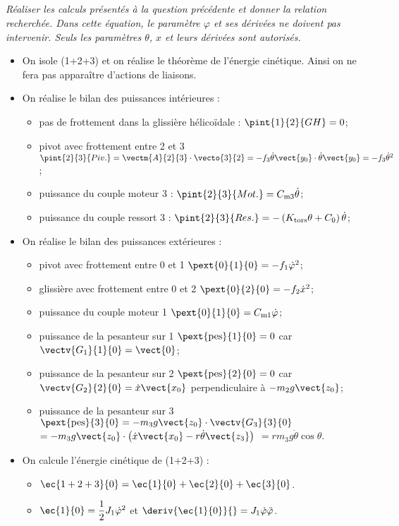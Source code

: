 \subparagraph{\label{q_06}}\textit{Réaliser les calculs présentés à la question précédente et donner la relation recherchée. Dans cette équation, le paramètre $\varphi$ et ses dérivées ne doivent pas intervenir. Seuls
les paramètres $\theta$, $x$ et leurs dérivées sont autorisés.}
\ifprof
\begin{corrige}
\begin{itemize}
\item On isole (1+2+3) et on réalise le théorème de l'énergie cinétique. Ainsi on ne fera pas apparaître d'actions de liaisons.
\item On réalise le bilan des puissances intérieures : 
\begin{itemize}
\item pas de frottement dans la glissière hélicoïdale : $\pint{1}{2}{GH} = 0$;
\item pivot avec frottement entre 2 et 3 $\pint{2}{3}{Piv.} = \vectm{A}{2}{3} \cdot  \vecto{3}{2} = -f_3 \dot{\theta} \vect{y_0} \cdot \dot{\theta}\vect{y_0} = -f_3 \dot{\theta}^2$;
\item puissance du couple moteur 3 : $\pint{2}{3}{Mot.} =  C_{\text{m3}}\dot{\theta}$; 
\item puissance du couple ressort 3 : $\pint{2}{3}{Res.} =  -\left(K_{\text{tors}}\theta + C_0\right) \dot{\theta}$; 
\end{itemize}
\item On réalise le bilan des puissances extérieures : 
\begin{itemize}
\item pivot avec frottement entre 0 et 1 $\pext{0}{1}{0} =-f_1 \dot{\varphi}^2 $;
\item glissière avec frottement entre 0 et 2 $\pext{0}{2}{0} = - f_2 \dot{x}^2 $;
\item puissance du couple moteur 1 $\pext{0}{1}{0} =C_{\text{m1}} \dot{\varphi} $;
\item puissance de la pesanteur sur 1 $\pext{\text{pes}}{1}{0} = 0 $ car $\vectv{G_1}{1}{0}=\vect{0}$; 
\item puissance de la pesanteur sur 2 $\pext{\text{pes}}{2}{0} = 0 $ car $\vectv{G_2}{2}{0} = \dot{x}\vect{x_0}$ perpendiculaire à $-m_2 g \vect{z_0}$; 
\item puissance de la pesanteur sur 3 $\pext{\text{pes}}{3}{0} = -m_3 g \vect{z_0}\cdot \vectv{G_3}{3}{0}$ 
$=-m_3 g \vect{z_0}\cdot \left( \dot{x}\vect{x_0} -r  \dot{\theta}\vect{z_3}\right)$ 
$=rm_3 g   \dot{\theta} \cos \theta$.
\end{itemize}
\item On calcule l'énergie cinétique de (1+2+3) :
\begin{itemize}
\item $\ec{1+2+3}{0}=\ec{1}{0}+\ec{2}{0}+\ec{3}{0}$.
\item $\ec{1}{0} =\dfrac{1}{2}J_1 \dot{\varphi}^2 $ et $\deriv{\ec{1}{0}}{} = J_1 \dot{\varphi}\ddot{\varphi}$.


\end{itemize}
\end{itemize}
\end{corrige}
